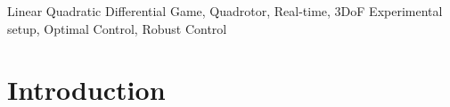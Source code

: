 \documentclass[conference]{IEEEtran}
\begin{document}
\begin{IEEEkeywords}
    Linear Quadratic Differential Game, Quadrotor, Real-time, 3DoF Experimental setup, Optimal Control, Robust Control
\end{IEEEkeywords}

\section{Introduction}
\end{document}
